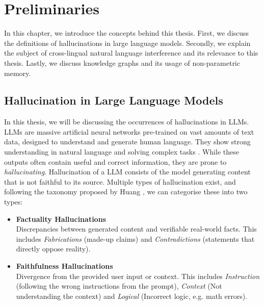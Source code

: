 \chapter{Preliminaries}\label{preliminaries}

\noindent In this chapter, we introduce the concepts behind this thesis. First, we discuss the definitions of hallucinations in large language models. Secondly, we explain the subject of cross-lingual natural language interference and its relevance to this thesis. Lastly, we discuss knowledge graphs and its usage of non-parametric memory. 

\section{Hallucination in Large Language Models}\label{pre:sec:llm}
In this thesis, we will be discussing the occurrences of hallucinations in LLMs. LLMs are massive artificial neural networks
pre-trained on vast amounts of text data, designed to understand and generate human language. They show strong understanding in natural language and solving 
complex tasks \cite{zhao2023survey}. While these outputs often contain useful and correct information, they are prone to \textit{hallucinating}. 
Hallucination of a LLM consists of the model generating content that is not faithful to its source. Multiple types of hallucination exist, 
and following the taxonomy proposed by Huang \etal
\cite{huang2025survey}, we can categorise these into two types: 
\begin{itemize}
    \item \textbf{Factuality Hallucinations} 
    \\ Discrepancies between generated content and verifiable real-world facts. 
    This includes \textit{Fabrications} (made-up claims) and \textit{Contradictions} (statements that directly oppose reality).
    \item \textbf{Faithfulness Hallucinations} 
    \\ Divergence from the provided user input or context. This includes \textit{Instruction} (following the wrong instructions from the prompt), 
    \textit{Context} (Not understanding the context) and \textit{Logical} (Incorrect logic, e.g. math errors).  
\end{itemize}

